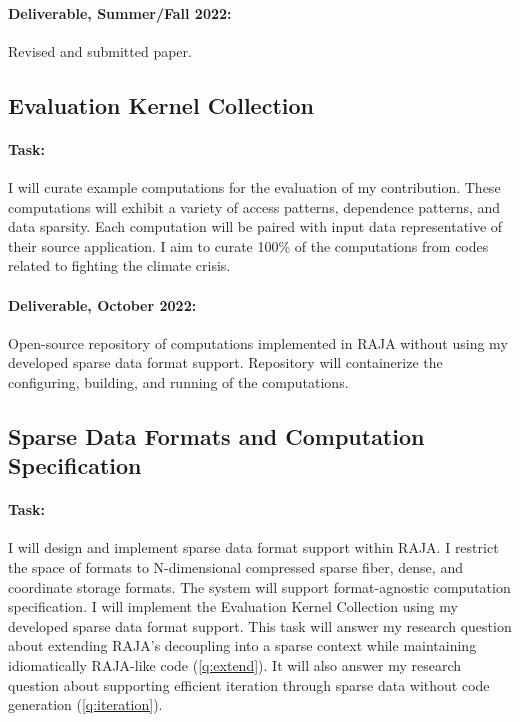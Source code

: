 \documentclass{article}
\begin{document}
\paragraph{Deliverable, Summer/Fall 2022:} Revised and submitted paper.


\subsection{Evaluation Kernel Collection}

\paragraph{Task:} I will curate example computations for the evaluation of my contribution.
These computations will exhibit a variety of access patterns, dependence patterns, and data sparsity.
Each computation will be paired with input data representative of their source application. 
I aim to curate 100\% of the computations from codes related to fighting the climate crisis.

\paragraph{Deliverable, October 2022:} Open-source repository of computations implemented in RAJA without using my developed sparse data format support.
Repository will containerize the configuring, building, and running of the computations. 

\subsection{Sparse Data Formats and Computation Specification}
\paragraph{Task:} 
I will design and implement sparse data format support within RAJA. 
I restrict the space of formats to N-dimensional compressed sparse fiber, dense, and coordinate storage formats.
The system will support format-agnostic computation specification.
I will implement the Evaluation Kernel Collection using my developed sparse data format support.
This task will answer my research question about extending RAJA's decoupling into a sparse context while maintaining idiomatically RAJA-like code (\ref{q:extend}).
It will also answer my research question about supporting efficient iteration through sparse data without code generation (\ref{q:iteration}). 
\end{document}
